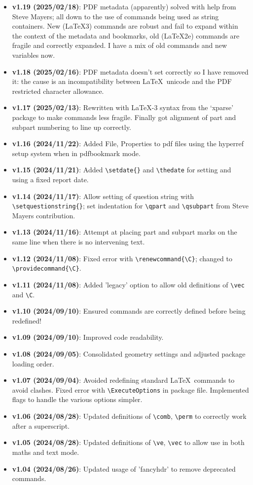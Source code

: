 \documentclass[a4paper,11pt,twoside]{article}
\begin{document}
\begin{itemize}
\item \textbf{v1.19 (2025/02/18)}: PDF metadata (apparently) solved with help from Steve Mayers; all down to the use of commands being used as string containers. New (\LaTeX3) commands are robust and fail to expand within the context of the metadata and bookmarks, old (\LaTeX2e) commands are fragile and correctly expanded. I have a mix of old commands and new variables now.
\item \textbf{v1.18 (2025/02/16)}: PDF metadata doesn't set correctly so I have removed it: the cause is an incompatibility between \LaTeX\ unicode and the PDF restricted character allowance.
\item \textbf{v1.17 (2025/02/13)}: Rewritten with \LaTeX-3 syntax from the `xparse' package to make commands less fragile. Finally got alignment of part and subpart numbering to line up correctly.
\item \textbf{v1.16 (2024/11/22)}: Added File, Properties to pdf files using the hyperref setup system when in pdfbookmark mode.
\item \textbf{v1.15 (2024/11/21)}: Added \verb|\setdate{}| and \verb|\thedate| for setting and using a fixed report date.
\item \textbf{v1.14 (2024/11/17)}: Allow setting of question string with \verb|\setquestionstring{}|; set indentation for \verb|\qpart| and \verb|\qsubpart| from Steve Mayers contribution.
\item \textbf{v1.13 (2024/11/16)}: Attempt at placing part and subpart marks on the same line when there is no intervening text.
\item \textbf{v1.12 (2024/11/08)}: Fixed error with \verb|\renewcommand{\C}|; changed to \\ \verb|\providecommand{\C}|.
\item \textbf{v1.11 (2024/11/08)}: Added 'legacy' option to allow old definitions of \verb|\vec| and \verb|\C|.
\item \textbf{v1.10 (2024/09/10)}: Ensured commands are correctly defined before being redefined!
\item \textbf{v1.09 (2024/09/10)}: Improved code readability.
\item \textbf{v1.08 (2024/09/05)}: Consolidated geometry settings and adjusted package loading order.
\item \textbf{v1.07 (2024/09/04)}: Avoided redefining standard \LaTeX\ commands to avoid clashes. Fixed error with \verb|\ExecuteOptions| in package file. Implemented flags to handle the various options simpler.
\item \textbf{v1.06 (2024/08/28)}: Updated definitions of \verb|\comb|, \verb|\perm| to correctly work after a superscript.
\item \textbf{v1.05 (2024/08/28)}: Updated definitions of \verb|\ve|, \verb|\vec| to allow use in both maths and text mode.
\item \textbf{v1.04 (2024/08/26)}: Updated usage of 'fancyhdr' to remove deprecated commands.
\end{itemize}
\end{document}
